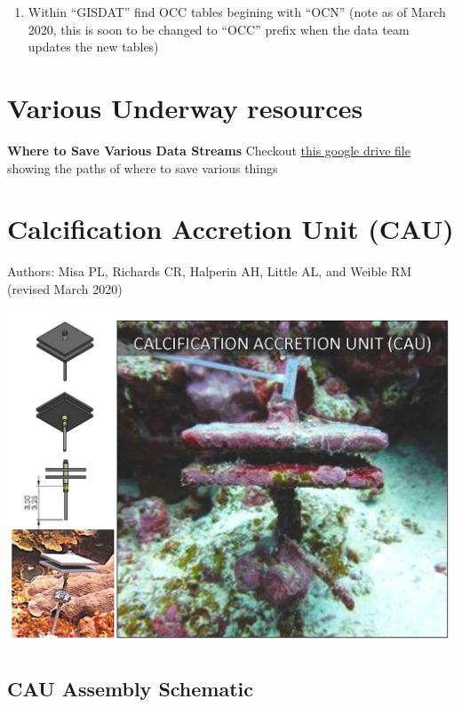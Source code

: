 \documentclass[]{book}
\begin{document}
\begin{enumerate}
\item
  Within ``GISDAT'' find OCC tables begining with ``OCN'' (note as of March 2020, this is soon to be changed to ``OCC'' prefix when the data team updates the new tables)
\end{enumerate}

\hypertarget{various-underway-resources}{%
\chapter{Various Underway resources}\label{various-underway-resources}}

\textbf{Where to Save Various Data Streams}
Checkout \href{https://docs.google.com/spreadsheets/d/16l1OQgGEunLoADh_MEGyIfbQL2w0u6aw/edit\#gid=1675337307}{this google drive file} showing the paths of where to save various things

\hypertarget{calcification-accretion-unit-cau}{%
\chapter{Calcification Accretion Unit (CAU)}\label{calcification-accretion-unit-cau}}

Authors: Misa PL, Richards CR, Halperin AH, Little AL, and Weible RM (revised March 2020)

\includegraphics{images/CAU.jpg}

\hypertarget{cau-assembly-schematic}{%
\section{CAU Assembly Schematic}\label{cau-assembly-schematic}}
\end{document}
